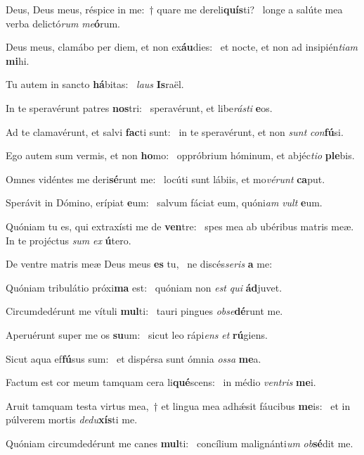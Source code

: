\item Deus, Deus meus, réspice in me:~† quare me dereli\textbf{quís}ti?~\psstar{} longe a salúte mea verba delictó\textit{rum} \textit{me}\textbf{ó}rum.
\item Deus meus, clamábo per diem, et non ex\textbf{áu}dies:~\psstar{} et nocte, et non ad insipién\textit{tiam} \textbf{mi}hi.
\item Tu autem in sancto \textbf{há}bitas:~\psstar{} \textit{laus} \textbf{Is}raël.
\item In te speravérunt patres \textbf{nos}tri:~\psstar{} speravérunt, et libe\textit{rásti} \textbf{e}os.
\item Ad te clamavérunt, et salvi \textbf{fac}ti sunt:~\psstar{} in te speravérunt, et non \textit{sunt} \textit{con}\textbf{fú}si.
\item Ego autem sum vermis, et non \textbf{ho}mo:~\psstar{} oppróbrium hóminum, et abjéc\textit{tio} \textbf{ple}bis.
\item Omnes vidéntes me deri\textbf{sé}runt me:~\psstar{} locúti sunt lábiis, et mo\textit{vérunt} \textbf{ca}put.
\item Sperávit in Dómino, erípiat \textbf{e}um:~\psstar{} salvum fáciat eum, quóni\textit{am} \textit{vult} \textbf{e}um.
\item Quóniam tu es, qui extraxísti me de \textbf{ven}tre:~\psstar{} spes mea ab ubéribus matris meæ. In te projéctus \textit{sum} \textit{ex} \textbf{ú}tero.
\item De ventre matris meæ Deus meus \textbf{es} tu,~\psstar{} ne discés\textit{seris} \textbf{a} me:
\item Quóniam tribulátio próxi\textbf{ma} est:~\psstar{} quóniam non \textit{est} \textit{qui} \textbf{ád}juvet.
\item Circumdedérunt me vítuli \textbf{mul}ti:~\psstar{} tauri pingues \textit{obse}\textbf{dé}runt me.
\item Aperuérunt super me os \textbf{su}um:~\psstar{} sicut leo rápi\textit{ens} \textit{et} \textbf{rú}giens.
\item Sicut aqua ef\textbf{fú}sus sum:~\psstar{} et dispérsa sunt ómnia \textit{ossa} \textbf{me}a.
\item Factum est cor meum tamquam cera li\textbf{qué}scens:~\psstar{} in médio \textit{ventris} \textbf{me}i.
\item Aruit tamquam testa virtus mea,~† et lingua mea adhǽsit fáucibus \textbf{me}is:~\psstar{} et in púlverem mortis \textit{dedu}\textbf{xís}ti me.
\item Quóniam circumdedérunt me canes \textbf{mul}ti:~\psstar{} concílium malignánti\textit{um} \textit{ob}\textbf{sé}dit me.
